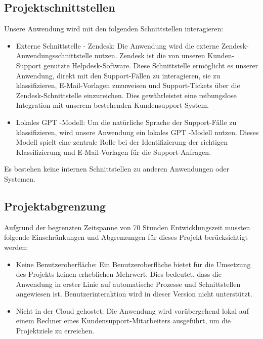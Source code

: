 \subsection{Projektschnittstellen} 
\label{sec:Projektschnittstellen}
Unsere Anwendung wird mit den folgenden Schnittstellen interagieren:
\begin{itemize}
	\item Externe Schnittstelle - Zendesk: Die Anwendung wird die externe Zendesk-Anwendungsschnittstelle nutzen. 
	Zendesk ist die von unseren Kunden-Support genutzte Helpdesk-Software.
	Diese Schnittstelle ermöglicht es unserer Anwendung, 
	direkt mit den Support-Fällen zu interagieren, sie zu klassifizieren, 
	E-Mail-Vorlagen zuzuweisen und Support-Tickets über die Zendesk-Schnittstelle
	einzureichen. Dies gewährleistet eine reibungslose Integration mit
	unserem bestehenden Kundensupport-System.
	\item Lokales \acs{GPT} -Modell: Um die natürliche Sprache der Support-Fälle zu klassifizieren, wird unsere Anwendung ein lokales \acs{GPT} -Modell nutzen. Dieses Modell spielt eine zentrale Rolle bei der Identifizierung der richtigen Klassifizierung und E-Mail-Vorlagen für die Support-Anfragen.
\end{itemize}
Es bestehen keine internen Schnittstellen zu anderen Anwendungen oder Systemen. 



\subsection{Projektabgrenzung} 
\label{sec:Projektabgrenzung}
Aufgrund der begrenzten Zeitspanne von 70 Stunden Entwicklungszeit mussten folgende Einschränkungen und Abgrenzungen für dieses Projekt berücksichtigt werden:
\begin{itemize}
	\item Keine Benutzeroberfläche: Ein Benutzeroberfläche bietet für die Umsetzung des Projekts keinen erheblichen Mehrwert. Dies bedeutet, dass die Anwendung in erster Linie auf automatische Prozesse und Schnittstellen angewiesen ist. Benutzerinteraktion wird in dieser Version nicht unterstützt.
	\item Nicht in der Cloud gehostet: Die Anwendung wird vorübergehend lokal auf einem Rechner eines Kundensupport-Mitarbeiters ausgeführt, um die Projektziele zu erreichen.
\end{itemize}